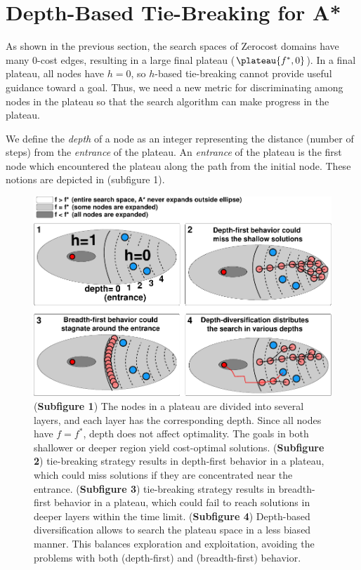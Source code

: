 \section{Depth-Based Tie-Breaking for A*}

\label{sec:depth}

As shown in the previous section, the search spaces of Zerocost domains have many 0-cost edges,
resulting in a large final plateau ($\plateau{f^*,0}$). In a final plateau,
all nodes have $h=0$, so $h$-based tie-breaking cannot provide
useful guidance toward a goal. Thus, we need a new metric for discriminating among nodes
in the plateau so that the search algorithm can make progress in the plateau.

We define the \emph{depth} of a node as an 
integer representing the distance (number of steps) from the
\emph{entrance} of the plateau.  An \emph{entrance} of the plateau is
the first node which encountered the plateau along the path from the
initial node. These notions are depicted in
 (subfigure 1). 

\begin{figure}[htbp]
  \centering
  \includegraphics{img/astar/plateau-2.pdf}
 \caption{(\textbf{Subfigure 1}) The nodes in a plateau are divided into several layers, and each layer has the corresponding depth. Since all nodes have $f=f^*$, depth does not affect optimality. The goals in both shallower or deeper region yield cost-optimal solutions.
 (\textbf{Subfigure 2}) \lifo tie-breaking strategy results in depth-first behavior in a
 plateau, which could miss solutions if they are concentrated near the entrance.
 (\textbf{Subfigure 3}) \fifo tie-breaking strategy results in  breadth-first behavior in a
 plateau, which could fail to reach solutions in deeper layers within the time limit.
 (\textbf{Subfigure 4}) Depth-based diversification allows \astar to search the plateau space
 in a less biased manner. This balances exploration and exploitation, avoiding the problems with both \lifo (depth-first) and \fifo (breadth-first) behavior.
 }
 \label{fig:plateau-depiction}
\end{figure}

